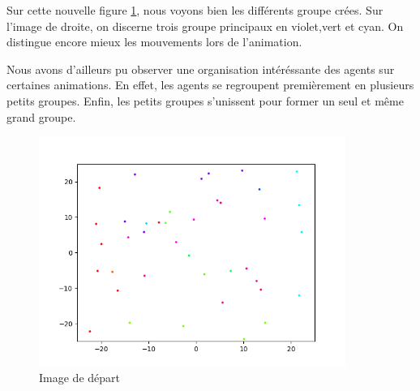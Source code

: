 \documentclass[french, a4paper, 12pt, openany]{report}
\begin{document}
   Sur cette nouvelle figure \ref{couleurs_image}, nous voyons bien les différents groupe crées. Sur l'image de droite, on discerne trois groupe principaux en violet,vert et cyan. On distingue encore mieux les mouvements lors de l'animation.
   
   Nous avons d'ailleurs pu observer une organisation intéréssante des agents sur certaines animations. En effet, les agents se regroupent premièrement en plusieurs petits groupes. Enfin, les petits groupes s'unissent pour former un seul et même grand groupe.
   
    \begin{figure}[!h]
		\centering
		\includegraphics[width=10cm]{images/image_8.png}
		\caption{Image de départ }
		\label{couleurs_image}
	\end{figure} 
	
\end{document}
